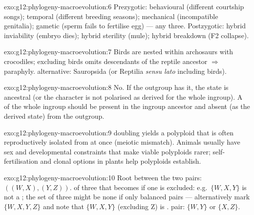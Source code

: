 \begin{solution}{exo:g12:phylogeny-macroevolution:6}
Prezygotic: behavioural (different courtship songs); temporal
(different breeding seasons); mechanical (incompatible genitalia);
gametic (sperm fails to fertilise egg) --- any three. Postzygotic:
hybrid inviability (embryo dies); hybrid sterility (mule); hybrid
breakdown (F2  collapse).
\end{solution}

\begin{solution}{exo:g12:phylogeny-macroevolution:7}
Birds are nested within archosaurs with crocodiles; excluding birds
omits descendants of the reptile ancestor $\Rightarrow$ paraphyly.
 alternative: Sauropsida (or Reptilia \emph{sensu lato}
including birds).
\end{solution}

\begin{solution}{exo:g12:phylogeny-macroevolution:8}
No. If the outgroup has it, the state is ancestral (or the character is
not polarised as derived for the whole ingroup). A  of the whole ingroup should be present in the ingroup
ancestor and absent (as the derived state) from the outgroup.
\end{solution}

\begin{solution}{exo:g12:phylogeny-macroevolution:9}
 doubling yields a polyploid that is often reproductively
isolated from  at once (meiotic mismatch). Animals usually have
sex  and developmental constraints that make viable
polyploids rarer; self-fertilisation and clonal options in plants help
polyploids establish.
\end{solution}

\begin{solution}{exo:g12:phylogeny-macroevolution:10}
Root between the two pairs: $((W,X),(Y,Z))$.  of three that
becomes  if one is excluded: e.g.\ $\{W,X,Y\}$ is not a
; the  set of three might be none if only balanced
pairs --- alternatively mark $\{W,X,Y,Z\}$ and note that $\{W,X,Y\}$
(excluding Z) is .  pair: $\{W,Y\}$ or
$\{X,Z\}$.
\end{solution}

